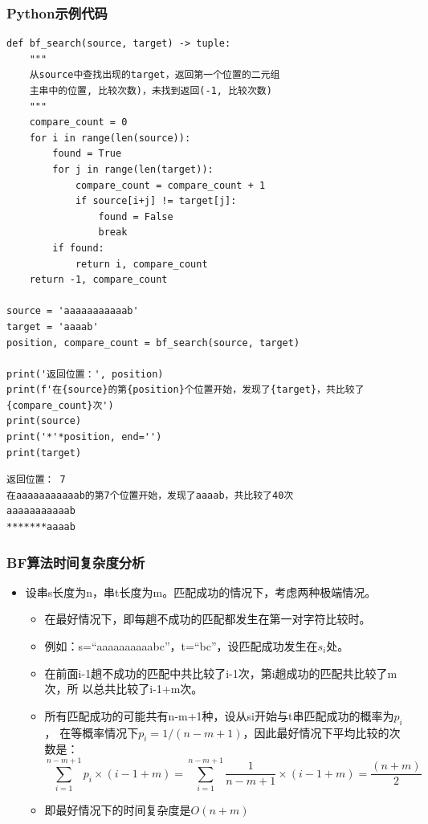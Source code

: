 \begin{frame}
  \frametitle{Python示例代码}
  \small
  \begin{verbatim}
def bf_search(source, target) -> tuple:
    """
    从source中查找出现的target，返回第一个位置的二元组
    主串中的位置, 比较次数)，未找到返回(-1, 比较次数)
    """
    compare_count = 0
    for i in range(len(source)):
        found = True
        for j in range(len(target)):
            compare_count = compare_count + 1
            if source[i+j] != target[j]:
                found = False
                break
        if found:
            return i, compare_count
    return -1, compare_count

source = 'aaaaaaaaaaab'
target = 'aaaab'
position, compare_count = bf_search(source, target)

print('返回位置：', position)
print(f'在{source}的第{position}个位置开始，发现了{target}，共比较了{compare_count}次')
print(source)
print('*'*position, end='')
print(target)
  \end{verbatim}

  \begin{verbatim}
返回位置： 7
在aaaaaaaaaaab的第7个位置开始，发现了aaaab，共比较了40次
aaaaaaaaaaab
*******aaaab
  \end{verbatim}
\end{frame}


\begin{frame}[fragile]
  \frametitle{BF算法时间复杂度分析}
  \begin{itemize}
  \item 设串s长度为n，串t长度为m。匹配成功的情况下，考虑两种极端情况。
    \begin{itemize}
    \item 在最好情况下，即每趟不成功的匹配都发生在第一对字符比较时。
    \item 例如：s=“aaaaaaaaaabc”，t=“bc”，设匹配成功发生在$s_i$处。
    \item 在前面i-1趟不成功的匹配中共比较了i-1次，第i趟成功的匹配共比较了m次，所
      以总共比较了i-1+m次。
    \item 所有匹配成功的可能共有n-m+1种，设从si开始与t串匹配成功的概率为$p_i$，
      在等概率情况下$p_i=1/(n-m+1)$，因此最好情况下平均比较的次数是：
      \[\sum_{i=1}^{n-m+1} p_i \times (i-1+m) = \sum_{i=1}^{n-m+1} \dfrac{1}{n-m+1} \times (i-1+m) = \dfrac{(n+m)}{2}\]

    \item 即最好情况下的时间复杂度是$O(n+m)$
    \end{itemize}
  \end{itemize}
\end{frame}

